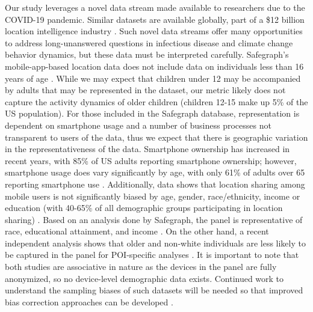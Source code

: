 \documentclass{article}
\begin{document}
Our study leverages a novel data stream made available to researchers due to the COVID-19 pandemic. Similar datasets are available globally, part of a \$12 billion location intelligence industry \cite{keegan2021there}. Such novel data streams offer many opportunities to address long-unanswered questions in infectious disease and climate change behavior dynamics, but these data must be interpreted carefully. Safegraph's mobile-app-based location data does not include data on individuals less than 16 years of age \cite{privacy}. While we may expect that children under 12 may be accompanied by adults that may be represented in the dataset, our metric likely does not capture the activity dynamics of older children (children 12-15 make up 5\% of the US population).  
For those included in the Safegraph database, representation is dependent on smartphone usage and a number of business processes not transparent to users of the data, thus we expect that there is geographic variation in the representativeness of the data. Smartphone ownership has increased in recent years, with 85\% of US adults reporting smartphone ownership; however, smartphone usage does vary significantly by age, with only 61\% of adults over 65 reporting smartphone use \cite{smartphone_usage}. Additionally, data shows that location sharing among mobile users is not significantly biased by age, gender, race/ethnicity, income or education (with 40-65\% of all demographic groups participating in location sharing) \cite{zickuhr201128}.
Based on an analysis done by Safegraph, the panel is representative of race, educational attainment, and income \cite{safegraph_bias}. On the other hand, a recent independent analysis shows that older and non-white individuals are less likely to be captured in the panel for POI-specific analyses \cite{coston2021leveraging}. It is important to note that both studies are associative in nature as the devices in the panel are fully anonymized, so no device-level demographic data exists. Continued work to understand the sampling biases of such datasets will be needed so that improved bias correction approaches can be developed \cite{coston2021leveraging}.
\end{document}
